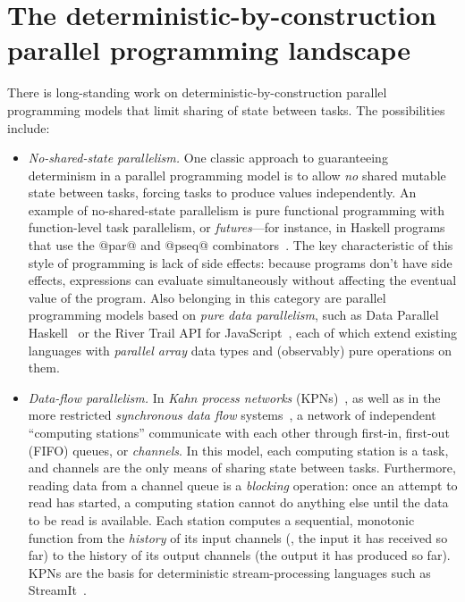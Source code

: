 \section{The deterministic-by-construction parallel programming landscape}\label{s:intro-landscape}

There is long-standing work on deterministic-by-construction parallel
programming models that limit sharing of state between tasks. The
possibilities include:

\begin{itemize}
\item \emph{No-shared-state parallelism.}  One classic approach to
  guaranteeing determinism in a parallel programming model is to allow
  \emph{no} shared mutable state between tasks, forcing tasks to
  produce values independently.  An example of no-shared-state
  parallelism is pure functional programming with function-level task
  parallelism, or \emph{futures}---for instance, in Haskell programs
  that use the @par@ and @pseq@ combinators~\cite{marlow-par}.  The
  key characteristic of this style of programming is lack of side
  effects: because programs don't have side effects, expressions can
  evaluate simultaneously without affecting the eventual value of the
  program.  Also belonging in this category are parallel programming
  models based on \emph{pure data parallelism}, such as Data Parallel
  Haskell~\cite{dph, dph-status} or the River Trail API for
  JavaScript~\cite{river-trail}, each of which extend existing
  languages with \emph{parallel array} data types and (observably)
  pure operations on them.

\item \emph{Data-flow parallelism.}  In \emph{Kahn process networks}
  (KPNs)~\cite{Kahn-1974}, as well as in the more restricted
  \emph{synchronous data flow} systems~\cite{Lee-sdn}, a network of
  independent ``computing stations'' communicate with each other
  through first-in, first-out (FIFO) queues, or \emph{channels}.  In
  this model, each computing station is a task, and channels are the
  only means of sharing state between tasks.  Furthermore, reading
  data from a channel queue is a \emph{blocking} operation: once an
  attempt to read has started, a computing station cannot do anything
  else until the data to be read is available.  Each station computes
  a sequential, monotonic function from the \emph{history} of its
  input channels (\ie, the input it has received so far) to the
  history of its output channels (the output it has produced so far).
  KPNs are the basis for deterministic stream-processing languages
  such as StreamIt~\cite{streamit-asplos}.


\end{itemize}
